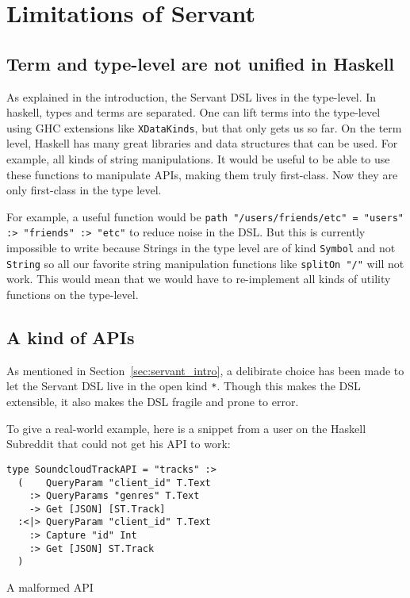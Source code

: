 \documentclass[12pt,a4paper]{article}
\begin{document}
\section{Limitations of Servant}\label{sec:issues}
\subsection{Term and type-level are not unified in Haskell}
As explained in the introduction, the Servant DSL lives in the type-level. In haskell, types and terms are separated. One can lift terms into the type-level using GHC extensions like \texttt{XDataKinds}, but that only gets us so far.  On the term level, Haskell has many great libraries and data structures that can be used. For example, all kinds of string manipulations. It would be useful to be able to use these functions to manipulate APIs, making them truly first-class. Now they are only first-class in the type level.

For example, a useful function would be \texttt{path "/users/friends/etc" = "users" :> "friends" :> "etc"} to reduce noise in the DSL\@. But this is currently impossible to write because Strings in the type level are of kind \texttt{Symbol} and not \texttt{String} so all our favorite string manipulation functions like \texttt{splitOn "/"} will not work. This would mean that we would have to re-implement all kinds of utility functions on the type-level.

\subsection{A kind of APIs}
As mentioned in Section~\ref{sec:servant_intro}, a delibirate choice has been made to let the Servant DSL live in the open kind \texttt{*}. Though this makes the DSL extensible, it also makes the DSL fragile and prone to error.

To give a real-world example, here is a snippet from a user on the Haskell Subreddit that could not get his API to work:

\begin{listing}[H]
\begin{verbatim}
type SoundcloudTrackAPI = "tracks" :> 
  (    QueryParam "client_id" T.Text 
    :> QueryParams "genres" T.Text
    -> Get [JSON] [ST.Track] 
  :<|> QueryParam "client_id" T.Text
    :> Capture "id" Int
    :> Get [JSON] ST.Track
  )
\end{verbatim}
\caption{A malformed API}
\label{code:problem}
\end{listing}
\end{document}

